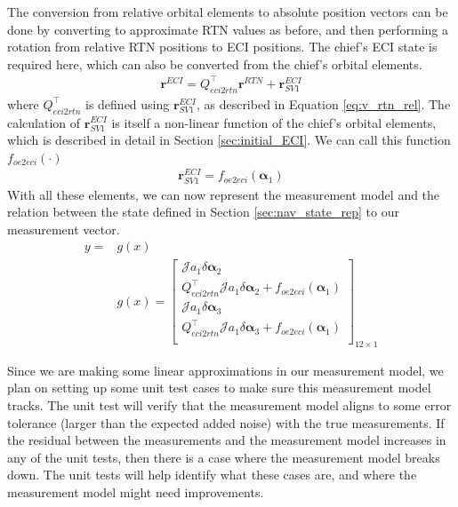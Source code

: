 The conversion from relative orbital elements to absolute position vectors can be done by converting to approximate RTN values as before, and then performing a rotation from relative RTN positions to ECI positions. The chief's ECI state is required here, which can also be converted from the chief's orbital elements.
\begin{align}
    \boldsymbol{r}^{ECI} = Q^\top_{eci2rtn} \boldsymbol{r}^{RTN} + \boldsymbol{r}_{SV1}^{ECI}
\end{align}
where $Q^\top_{eci2rtn}$ is defined using $\boldsymbol{r}_{SV1}^{ECI}$, as described in Equation \ref{eq:v_rtn_rel}. The calculation of $\boldsymbol{r}_{SV1}^{ECI}$ is itself a non-linear function of the chief's orbital elements, which is described in detail in Section \ref{sec:initial_ECI}. We can call this function $f_{oe2eci}(\cdot)$
\begin{align}
    \boldsymbol{r}_{SV1}^{ECI} = f_{oe2eci}(\boldsymbol{\alpha}_1)
\end{align}
With all these elements, we can now represent the measurement model and the relation between the state defined in Section \ref{sec:nav_state_rep} to our measurement vector.
\begin{align}
    y = &g(x) \\
    &g(x) = \begin{bmatrix}
        \mathcal{J}
a_1\delta \boldsymbol{\alpha}_2 \\
            Q^\top_{eci2rtn} \mathcal{J}
a_1\delta \boldsymbol{\alpha}_2 + f_{oe2eci}(\boldsymbol{\alpha}_1) \\
        \mathcal{J}
a_1\delta \boldsymbol{\alpha}_3 \\
            Q^\top_{eci2rtn} \mathcal{J}
a_1\delta \boldsymbol{\alpha}_3 + f_{oe2eci}(\boldsymbol{\alpha}_1) \\
    \end{bmatrix}_{12\times 1}
\end{align}

Since we are making some linear approximations in our measurement model, we plan on setting up some unit test cases to make sure this measurement model tracks. The unit test will verify that the measurement model aligns to some error tolerance (larger than the expected added noise) with the true measurements. If the residual between the measurements and the measurement model increases in any of the unit tests, then there is a case where the measurement model breaks down. The unit tests will help identify what these cases are, and where the measurement model might need improvements.

